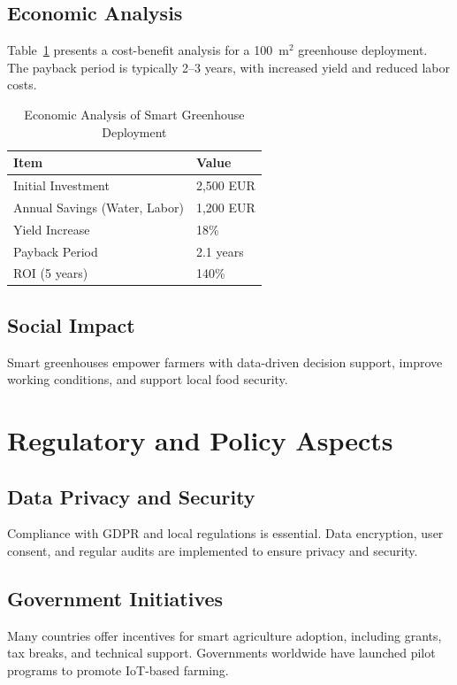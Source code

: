 \documentclass[12pt,a4paper]{article}
\begin{document}
\subsection{Economic Analysis}
Table~\ref{tab:economic} presents a cost-benefit analysis for a 100~m$^2$ greenhouse deployment. The payback period is typically 2--3 years, with increased yield and reduced labor costs.

\begin{table}[H]
    \centering
    \caption{Economic Analysis of Smart Greenhouse Deployment}
    \begin{tabular}{@{}ll@{}}
    \toprule
    Item & Value \\
    \midrule
    Initial Investment & 2,500 EUR \\
    Annual Savings (Water, Labor) & 1,200 EUR \\
    Yield Increase & 18\% \\
    Payback Period & 2.1 years \\
    ROI (5 years) & 140\% \\
    \bottomrule
    \end{tabular}\label{tab:economic}
\end{table}

\subsection{Social Impact}
Smart greenhouses empower farmers with data-driven decision support, improve working conditions, and support local food security.

\section{Regulatory and Policy Aspects}
\subsection{Data Privacy and Security}
Compliance with GDPR and local regulations is essential. Data encryption, user consent, and regular audits are implemented to ensure privacy and security.

\subsection{Government Initiatives}
Many countries offer incentives for smart agriculture adoption, including grants, tax breaks, and technical support. Governments worldwide have launched pilot programs to promote IoT-based farming.
\end{document}
